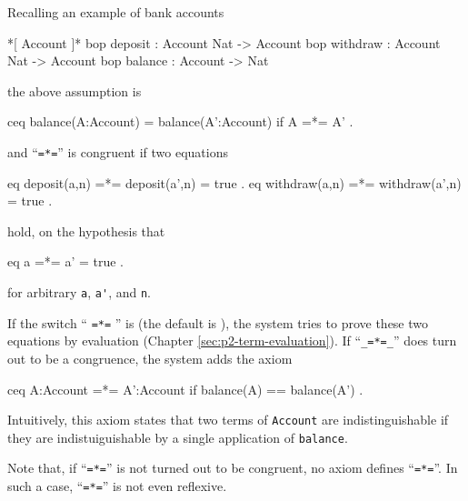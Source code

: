 \documentclass[a4paper]{memoir}
\begin{document}
Recalling an example of bank accounts
\begin{vvtm}
\begin{ccode}
  *[ Account ]*
  bop deposit : Account Nat -> Account
  bop withdraw : Account Nat -> Account
  bop balance : Account -> Nat
\end{ccode}
\end{vvtm}
the above assumption is
\begin{vvtm}
\begin{ccode}
  ceq balance(A:Account) = balance(A':Account) if A =*= A' .
\end{ccode}
\end{vvtm}
and ``\verb|=*=|'' is congruent if two equations
\begin{vvtm}
\begin{ccode}
  eq deposit(a,n) =*= deposit(a',n) = true .
  eq withdraw(a,n) =*= withdraw(a',n) = true .
\end{ccode}
\end{vvtm}
hold, on the hypothesis that
\begin{vvtm}
\begin{ccode}
  eq a =*= a' = true .
\end{ccode}
\end{vvtm}
for arbitrary \verb|a|, \verb|a'|, and \verb|n|.

If the switch `` \verb|=*=| '' is 
(the default is ),
the system tries to prove these two equations
by evaluation (Chapter \ref{sec:p2-term-evaluation}).
If ``\verb|_=*=_|'' does turn out to be a congruence, the system
adds the axiom
\begin{vvtm}
\begin{ccode}
  ceq A:Account =*= A':Account if balance(A) == balance(A') .
\end{ccode}
\end{vvtm}
Intuitively, this axiom states that two terms of \verb|Account| are
indistinguishable if they are indistuiguishable by a single
application of \verb|balance|.

Note that, if ``\verb|=*=|'' is not turned out to be congruent,
no axiom defines ``\verb|=*=|''. In such a case, ``\verb|=*=|''
is not even reflexive.

\end{document}
